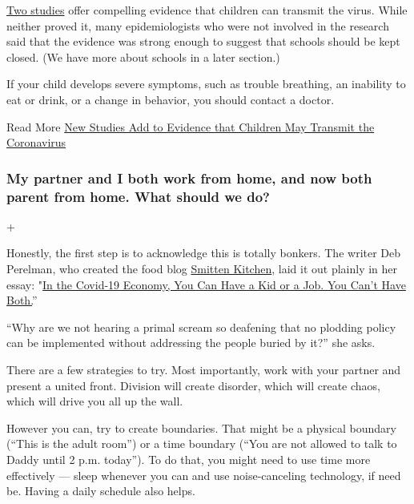 \href{https://www.nytimes3xbfgragh.onion/2020/05/05/health/coronavirus-children-transmission-school.html}{Two
studies} offer compelling evidence that children can transmit the virus.
While neither proved it, many epidemiologists who were not involved in
the research said that the evidence was strong enough to suggest that
schools should be kept closed. (We have more about schools in a later
section.)

If your child develops severe symptoms, such as trouble breathing, an
inability to eat or drink, or a change in behavior, you should contact a
doctor.

 Read More
\href{https://www.nytimes3xbfgragh.onion/2020/05/05/health/coronavirus-children-transmission-school.html}{New
Studies Add to Evidence that Children May Transmit the Coronavirus}

\hypertarget{my-partner-and-i-both-work-from-home-and-now-both-parent-from-home-what-should-we-do}{%
\subsubsection{My partner and I both work from home, and now both parent
from home. What should we
do?}\label{my-partner-and-i-both-work-from-home-and-now-both-parent-from-home-what-should-we-do}}

+

Honestly, the first step is to acknowledge this is totally bonkers. The
writer Deb Perelman, who created the food blog
\href{https://smittenkitchen.com/}{Smitten Kitchen}, laid it out plainly
in her essay:
"\href{https://www.nytimes3xbfgragh.onion/2020/07/02/business/covid-economy-parents-kids-career-homeschooling.html}{In
the Covid-19 Economy, You Can Have a Kid or a Job. You Can't Have
Both.}''

``Why are we not hearing a primal scream so deafening that no plodding
policy can be implemented without addressing the people buried by it?''
she asks.

There are a few strategies to try. Most importantly, work with your
partner and present a united front. Division will create disorder, which
will create chaos, which will drive you all up the wall.

However you can, try to create boundaries. That might be a physical
boundary (``This is the adult room'') or a time boundary (``You are not
allowed to talk to Daddy until 2 p.m. today''). To do that, you might
need to use time more effectively --- sleep whenever you can and use
noise-canceling technology, if need be. Having a daily schedule also
helps.

